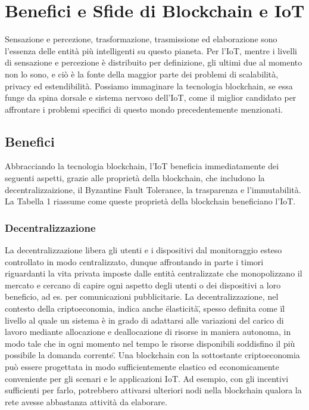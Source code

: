 \section{Benefici e Sfide di Blockchain e IoT}
Sensazione e percezione, trasformazione, trasmissione ed elaborazione sono l'essenza delle entità più intelligenti su questo pianeta. Per l'IoT, mentre i livelli di sensazione e percezione è distribuito per definizione, gli ultimi due al momento non lo sono, e ciò è la fonte della maggior parte dei problemi di scalabilità, privacy ed estendibilità. Possiamo immaginare la tecnologia blockchain, se essa funge da spina dorsale e sistema nervoso dell'IoT, come il miglior candidato per affrontare i problemi specifici di questo mondo precedentemente menzionati.


\subsection{Benefici}
Abbracciando la tecnologia blockchain, l'IoT beneficia immediatamente dei seguenti aspetti, grazie alle proprietà della blockchain, che includono la decentralizzaizione, il Byzantine Fault Tolerance, la trasparenza e l'immutabilità. La Tabella 1 riassume come queste proprietà della blockchain beneficiano l'IoT.


\subsubsection{Decentralizzazione}
La decentralizzazione libera gli utenti e i dispositivi dal monitoraggio esteso controllato in modo centralizzato, dunque affrontando in parte i timori riguardanti la vita privata imposte dalle entità centralizzate che monopolizzano il mercato e cercano di capire ogni aspetto degli utenti o dei dispositivi a loro beneficio, ad es. per comunicazioni pubblicitarie. La decentralizzazione, nel contesto della criptoeconomia, indica anche \"elasticità\", spesso definita come \"il livello al quale un sistema è in grado di adattarsi alle variazioni del carico di lavoro mediante allocazione e deallocazione di risorse in maniera autonoma, in modo tale che in ogni momento nel tempo le risorse disponibili soddisfino il più possibile la domanda corrente\". Una blockchain con la sottostante criptoeconomia può essere progettata in modo sufficientemente elastico ed economicamente conveniente per gli scenari e le applicazioni IoT. Ad esempio, con gli  incentivi sufficienti per farlo, potrebbero attivarsi ulteriori nodi nella blockchain qualora la rete avesse abbastanza attività da elaborare.

